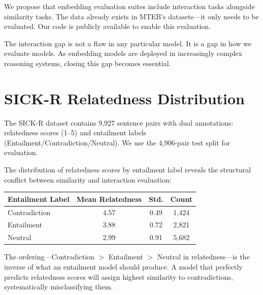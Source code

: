\documentclass{article}
\begin{document}
We propose that embedding evaluation suites include interaction tasks alongside similarity tasks. The data already exists in MTEB's datasets---it only needs to be evaluated. Our code is publicly available to enable this evaluation.

The interaction gap is not a flaw in any particular model. It is a gap in how we evaluate models. As embedding models are deployed in increasingly complex reasoning systems, closing this gap becomes essential.




\appendix

\section{SICK-R Relatedness Distribution}
\label{app:sickr}

The SICK-R dataset contains 9,927 sentence pairs with dual annotations: relatedness scores (1--5) and entailment labels (Entailment/Contradiction/Neutral). We use the 4,906-pair test split for evaluation.

The distribution of relatedness scores by entailment label reveals the structural conflict between similarity and interaction evaluation:

\begin{center}
\begin{tabular}{@{}lccc@{}}
\toprule
\textbf{Entailment Label} & \textbf{Mean Relatedness} & \textbf{Std.} & \textbf{Count} \\
\midrule
Contradiction & 4.57 & 0.49 & 1,424 \\
Entailment & 3.88 & 0.72 & 2,821 \\
Neutral & 2.99 & 0.91 & 5,682 \\
\bottomrule
\end{tabular}
\end{center}

The ordering---Contradiction $>$ Entailment $>$ Neutral in relatedness---is the inverse of what an entailment model should produce. A model that perfectly predicts relatedness scores will assign highest similarity to contradictions, systematically misclassifying them.
\end{document}
